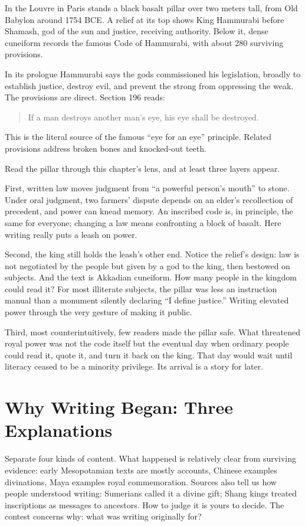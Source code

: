 In the Louvre in Paris stands a black basalt pillar over two meters tall, from Old Babylon around 1754 BCE. A relief at its top shows King Hammurabi before Shamash, god of the sun and justice, receiving authority. Below it, dense cuneiform records the famous Code of Hammurabi, with about 280 surviving provisions.

In its prologue Hammurabi says the gods commissioned his legislation, broadly to establish justice, destroy evil, and prevent the strong from oppressing the weak. The provisions are direct. Section 196 reads:

\begin{quote}
If a man destroys another man's eye, his eye shall be destroyed.
\end{quote}
This is the literal source of the famous ``eye for an eye'' principle. Related provisions address broken bones and knocked-out teeth.

Read the pillar through this chapter's lens, and at least three layers appear.

First, written law moves judgment from ``a powerful person's mouth'' to stone. Under oral judgment, two farmers' dispute depends on an elder's recollection of precedent, and power can knead memory. An inscribed code is, in principle, the same for everyone; changing a law means confronting a block of basalt. Here writing really puts a leash on power.

Second, the king still holds the leash's other end. Notice the relief's design: law is not negotiated by the people but given by a god to the king, then bestowed on subjects. And the text is Akkadian cuneiform. How many people in the kingdom could read it? For most illiterate subjects, the pillar was less an instruction manual than a monument silently declaring ``I define justice.'' Writing elevated power through the very gesture of making it public.

Third, most counterintuitively, few readers made the pillar safe. What threatened royal power was not the code itself but the eventual day when ordinary people could read it, quote it, and turn it back on the king. That day would wait until literacy ceased to be a minority privilege. Its arrival is a story for later.

\section{Why Writing Began: Three Explanations}
Separate four kinds of content. What happened is relatively clear from surviving evidence: early Mesopotamian texts are mostly accounts, Chinese examples divinations, Maya examples royal commemoration. Sources also tell us how people understood writing: Sumerians called it a divine gift; Shang kings treated inscriptions as messages to ancestors. How to judge it is yours to decide. The contest concerns why: what was writing originally for?

